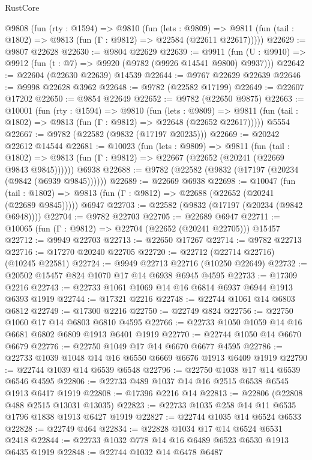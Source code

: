 \begin{lexlean}{RustCore}
\begin{coremodule}
  @9808
    (fun (rty : @1594) =>
    @9810
      (fun (lets : @9809) =>
      @9811 (fun (tail : @1802) => @9813 (fun (Γ : @9812) => @22584 (@22611 @22617)))))
@22629 := @9807 @22628
@22630 := @9804 @22629
@22639 := @9911
    (fun (U : @9910) => @9912 (fun (t : @7) => @9920 (@9782 (@9926 @14541 @9800) @9937)))
@22642 := @22604 (@22630 @22639) @14539
@22644 := @9767 @22629 @22639
@22646 := @9998 @22628 @3962
@22648 := @9782 (@22582 @17199)
@22649 := @22607 @17202
@22650 := @9854 @22649
@22652 := @9782 (@22650 @9875)
@22663 := @10001
    (fun (rty : @1594) =>
    @9810
      (fun (lets : @9809) =>
      @9811 (fun (tail : @1802) => @9813 (fun (Γ : @9812) => @22648 (@22652 @22617)))))
    @5554
@22667 := @9782 (@22582 (@9832 (@17197 @20235)))
@22669 := @20242 @22612 @14544
@22681 := @10023
    (fun (lets : @9809) =>
    @9811
      (fun (tail : @1802) =>
      @9813 (fun (Γ : @9812) => @22667 (@22652 (@20241 (@22669 @9843 @9845))))))
    @6938
@22688 := @9782 (@22582 (@9832 (@17197 (@20234 (@9842 (@6939 @9845))))))
@22689 := @22669 @6938
@22698 := @10047
    (fun (tail : @1802) => @9813 (fun (Γ : @9812) => @22688 (@22652 (@20241 (@22689 @9845)))))
    @6947
@22703 := @22582 (@9832 (@17197 (@20234 (@9842 @6948))))
@22704 := @9782 @22703
@22705 := @22689 @6947
@22711 := @10065 (fun (Γ : @9812) => @22704 (@22652 (@20241 @22705))) @15457
@22712 := @9949 @22703
@22713 := @22650 @17267
@22714 := @9782 @22713
@22716 := @17270 @20240 @22705
@22720 := @22712 (@22714 @22716) (@10245 @22581)
@22724 := @9949 @22713 @22716 (@10250 @22649)
@22732 := @20502 @15457 @824 @1070 @17 @14 @6938 @6945 @4595
@22733 := @17309 @2216
@22743 := @22733 @1061 @1069 @14 @16 @6814 @6937 @6944 @1913 @6393 @1919
@22744 := @17321 @2216
@22748 := @22744 @1061 @14 @6803 @6812
@22749 := @17300 @2216
@22750 := @22749 @824
@22756 := @22750 @1060 @17 @14 @6803 @6810 @4595
@22766 := @22733 @1050 @1059 @14 @16 @6681 @6802 @6809 @1913 @6401 @1919
@22770 := @22744 @1050 @14 @6670 @6679
@22776 := @22750 @1049 @17 @14 @6670 @6677 @4595
@22786 := @22733 @1039 @1048 @14 @16 @6550 @6669 @6676 @1913 @6409 @1919
@22790 := @22744 @1039 @14 @6539 @6548
@22796 := @22750 @1038 @17 @14 @6539 @6546 @4595
@22806 := @22733 @489 @1037 @14 @16 @2515 @6538 @6545 @1913 @6417 @1919
@22808 := @17396 @2216 @14
@22813 := @22806 (@22808 @488 @2515 @13031 @13035)
@22823 := @22733 @1035 @258 @14 @11 @6535 @1796 @1838 @1913 @6427 @1919
@22827 := @22744 @1035 @14 @6524 @6533
@22828 := @22749 @464
@22834 := @22828 @1034 @17 @14 @6524 @6531 @2418
@22844 := @22733 @1032 @778 @14 @16 @6489 @6523 @6530 @1913 @6435 @1919
@22848 := @22744 @1032 @14 @6478 @6487

\end{coremodule}
\end{lexlean}
